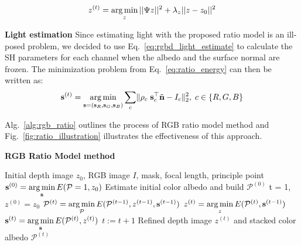 \begin{equation}\label{eq:ratio_depth_refine}
    z^{(t)}= \operatorname*{arg\,min}_{z}  ||\Psi z||^2 + \lambda_z||z - z_0||^2
\end{equation}

\textbf{Light estimation}
Since estimating light with the proposed ratio model is an ill-posed problem, we decided to use Eq.~\ref{eq:rgbd_light_estimate} to calculate the SH parameters for each channel when the albedo and the surface normal are frozen. The minimization problem from Eq.~\ref{eq:ratio_energy} can then be written as:
\begin{equation}\label{eq:ratio_light_estimate}
    \mathbf{s}^{(t)} = \operatorname*{arg\,min}_{\mathbf{s} = (\mathbf{s}_R, \mathbf{s}_G, \mathbf{s}_B)}\sum_{c} \lVert \rho_c \; \mathbf{s}_c^\top \tilde{\mathbf{n}} - I_c\rVert^2_2, \; c\in\{R,G,B\}
\end{equation}

Alg.~\ref{alg:rgb_ratio} outlines the process of RGB ratio model method and Fig.~\ref{fig:ratio_illustration} illustrates the effectiveness of this approach.

\begin{algorithm}[!htbp]
    \begin{algorithmic}[1]
          \caption{\textbf{RGB Ratio Model method}}
        \label{alg:rgb_ratio}
         \renewcommand{\algorithmicrequire}{\textbf{Input:}}
         \renewcommand{\algorithmicensure}{\textbf{Output:}}
         \REQUIRE Initial depth image $z_0$, RGB image $I$, mask, focal length, principle point
         \vspace{1.8mm}
         \STATE $\mathbf{s}^{(0)} = \operatorname*{arg\,min} \limits_{\mathbf{s}} E(\mathcal{P} =1, z_0)$ 
         \STATE Estimate initial color albedo and build $\mathcal{P}^{(0)}$  
         \STATE t = 1, $z^{(0)} = z_0$
         \vspace{1.8mm}
           \vspace{1.8mm}
            \STATE $\mathcal{P}^{(t)} = \operatorname*{arg\,min} \limits_{\mathcal{P}} E(\mathcal{P}^{(t-1)}, z^{(t-1)}, \mathbf{s}^{(t-1)})$ 
              \STATE $z^{(t)} = \operatorname*{arg\,min} \limits_{z} E(\mathcal{P}^{(t)}, \mathbf{s}^{(t-1)})$ 
              \STATE $\mathbf{s}^{(t)} = \operatorname*{arg\,min} \limits_{\mathbf{s}} E(\mathcal{P}^{(t)}, z^{(t)})$ 
              \vspace{1.8mm}
                  \STATE $t := t + 1$
         \vspace{1.8mm}
          \ENDWHILE
          \ENSURE  Refined depth image $z^{(t)}$ and stacked color albedo $\mathcal{P}^{(t)}$
    \end{algorithmic}
\end{algorithm}

